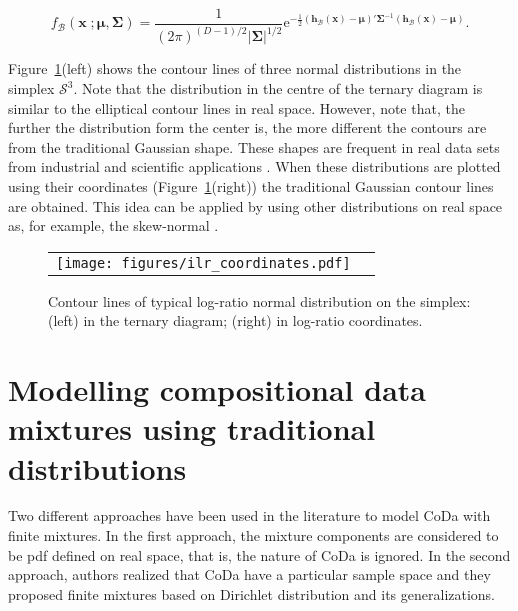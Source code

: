 \documentclass[12pt, a4paper]{article}
\newcommand{\m}[1]{\boldsymbol{#1}}
\begin{document}
\begin{equation}\label{eq:densSNormal}
f_\mathcal{B}(\mathbf{x}\;; \m\mu, \m\Sigma) =\frac{1}{(2\pi)^{(D-1)/2} |\mathbf{\Sigma}|^{1/2}} \text{e}^{ -{\frac{1}{2}} \left(\mathbf{h}_\mathcal{B}(\textbf{x})- \m\mu \right)' \mathbf{\Sigma}^{-1} \left( \mathbf{h}_\mathcal{B}(\textbf{x})- \m\mu \right)}.
\end{equation}

Figure~\ref{fig01}(left) shows the contour lines of three normal distributions in the simplex $\mathcal{S}^3$. Note that the distribution in the centre of the ternary diagram is similar to the elliptical contour lines in real space. However, note that, the further the distribution form the center is, the more different the contours are from the traditional Gaussian shape. These shapes are frequent in real data sets from industrial and scientific applications \citep{buccianti2011natural,vives2014individual}.
When these distributions are plotted using their coordinates (Figure~\ref{fig01}(right)) the traditional Gaussian contour lines are obtained. This idea can be applied by using other distributions on real space as, for example, the skew-normal  \citep{mateu2007skew}.


\begin{figure}[thbp]
\begin{center}
\begin{tabular}{cc}
  \texttt{[image: figures/ilr\_coordinates.pdf]} \\
 \end{tabular}
 \caption{Contour lines of typical log-ratio normal distribution on the simplex: (left) in the ternary diagram; (right) in log-ratio coordinates. }\label{fig01}
\end{center}
\end{figure}



\section{Modelling compositional data mixtures using traditional distributions}
\label{standard_section}

\noindent Two different approaches have been used in the literature to model CoDa with finite mixtures. 
In the first approach,  the mixture components are considered to be pdf defined on real space, that is, the nature of CoDa is ignored. In the second approach, authors realized that CoDa have a particular sample space and they proposed finite mixtures based on Dirichlet distribution and its generalizations.
\end{document}
